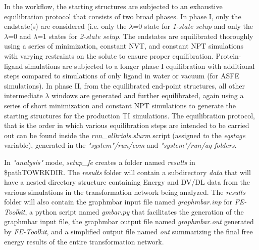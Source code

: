\documentclass[11pt,letterpaper,titlepage]{article}
\begin{document}
\vspace{0.1cm}

In the workflow, the starting structures are subjected to an exhaustive equilibration protocol
that consists of two broad phases. In phase I, only the endstate(s) are considered (i.e. only the
$\lambda$=0 state for \textit{1-state setup} and only the $\lambda$=0 and $\lambda$=1 states for 
\textit{2-state setup}. The endstates are equilibrated thoroughly using a series of minimization, 
constant NVT, and constant NPT simulations with varying restraints on the solute to ensure proper
equilibration. Protein-ligand simulations are subjected to a longer phase I equilibration with 
additional steps compared to simulations of only ligand in water or vacuum (for ASFE simulations). 
In phase II, from the equilibrated end-point structures, all other intermediate 
$\lambda$ windows are generated and further equilibrated, again using a series of short minimization
and constant NPT simulations to generate the starting structures for the production TI simulations.
The equilibration protocol, that is the order in which various equilibration steps are intended to be 
carried out can be found inside the \textit{run\_alltrials.slurm} script (assigned to the 
\textit{eqstage} variable), generated in the \textit{"system"/run/com} and \textit{"system"/run/aq folders}.

\vspace{0.1cm}

In \textit{"analysis"} mode, \textit{setup\_fe} creates a folder named \textit{results} in \$pathTOWRKDIR. 
The \textit{results} folder will contain a subdirectory \textit{data} that will have a nested directory 
structure containing Energy and DV/DL data from the various simulations in the transformation network 
being analyzed. The \textit{results} folder will also contain the graphmbar input file named
\textit{graphmbar.inp} for \textit{FE-Toolkit}, a python script named \textit{gmbar.py} that facilitates 
the generation of the graphmbar input file, the graphmbar output file named \textit{graphmbar.out} 
generated by \textit{FE-Toolkit}, and a simplified output file named \textit{out} summarizing the final 
free energy results of the entire transformation network.
\end{document}
